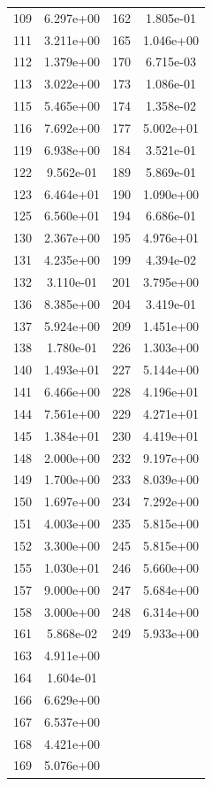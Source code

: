 \documentclass[12pt]{article}
\begin{document}
\begin{longtable}{@{}cccc@{}}
109 & 6.297e+00 & 162 & 1.805e-01 \\
111 & 3.211e+00 & 165 & 1.046e+00 \\
112 & 1.379e+00 & 170 & 6.715e-03 \\
113 & 3.022e+00 & 173 & 1.086e-01 \\
115 & 5.465e+00 & 174 & 1.358e-02 \\
116 & 7.692e+00 & 177 & 5.002e+01 \\
119 & 6.938e+00 & 184 & 3.521e-01 \\
122 & 9.562e-01 & 189 & 5.869e-01 \\
123 & 6.464e+01 & 190 & 1.090e+00 \\
125 & 6.560e+01 & 194 & 6.686e-01 \\
130 & 2.367e+00 & 195 & 4.976e+01 \\
131 & 4.235e+00 & 199 & 4.394e-02 \\
132 & 3.110e-01 & 201 & 3.795e+00 \\
136 & 8.385e+00 & 204 & 3.419e-01 \\
137 & 5.924e+00 & 209 & 1.451e+00 \\
138 & 1.780e-01 & 226 & 1.303e+00 \\
140 & 1.493e+01 & 227 & 5.144e+00 \\
141 & 6.466e+00 & 228 & 4.196e+01 \\
144 & 7.561e+00 & 229 & 4.271e+01 \\
145 & 1.384e+01 & 230 & 4.419e+01 \\
148 & 2.000e+00 & 232 & 9.197e+00 \\
149 & 1.700e+00 & 233 & 8.039e+00 \\
150 & 1.697e+00 & 234 & 7.292e+00 \\
151 & 4.003e+00 & 235 & 5.815e+00 \\
152 & 3.300e+00 & 245 & 5.815e+00 \\
155 & 1.030e+01 & 246 & 5.660e+00 \\
157 & 9.000e+00 & 247 & 5.684e+00 \\
158 & 3.000e+00 & 248 & 6.314e+00 \\
161 & 5.868e-02 & 249 & 5.933e+00 \\
163 & 4.911e+00 &  &  \\
164 & 1.604e-01 &  &  \\
166 & 6.629e+00 &  &  \\
167 & 6.537e+00 &  &  \\
168 & 4.421e+00 &  &  \\
169 & 5.076e+00 &  &  \\

\end{longtable}
\end{document}
